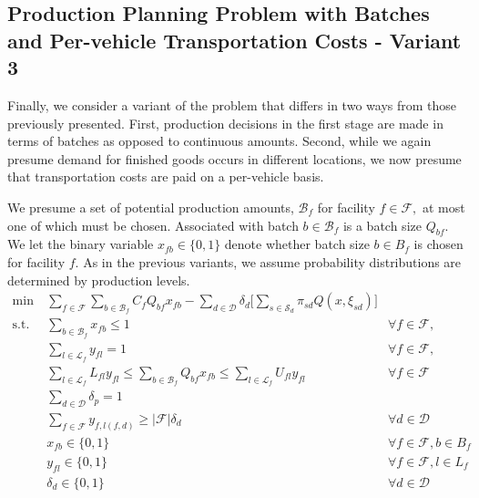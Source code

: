 \documentclass[12pt]{article}
\theoremstyle{thmstylethree}%
\newcommand{\mtc}[1] {\mathcal{#1}}
\begin{document}
\subsection{Production Planning Problem with Batches and Per-vehicle Transportation Costs - Variant 3}
\label{subsec:pp_pv_trans_costs}
Finally, we consider a variant of the problem that differs in two ways from those previously presented. First, production decisions in the first stage are made in terms of batches as opposed to continuous amounts. Second, while we again presume demand for finished goods occurs in different locations, we now presume that transportation costs are paid on a per-vehicle basis. 

We presume a set of potential production amounts, $\mtc{B}_{f}$ for facility $f \in \mtc{F},$ at most one of which must be chosen. Associated with batch $b \in \mtc{B}_{f}$ is a batch size $Q_{bf}$. We let the binary variable $x_{fb} \in \{0,1\}$ denote whether batch size $b \in B_{f}$ is chosen for facility $f.$ As in the previous variants, we assume probability distributions are determined by production levels.  %
\begin{subequations}\label{eq:ppp3}
\begin{align}
\label{eq:ppp3:obj} \min~&\sum_{f\in\mathcal{F}}\sum_{b \in \mtc{B}_{f}}C_{f}Q_{bf}x_{fb}- \sum_{d\in\mathcal{D}}\delta_{d}\Bigg[\sum_{s\in\mathcal{S}_{d}}\pi_{sd}Q(x,\xi_{sd})\Bigg]  \\
\label{eq:ppp3:c0}\text{s.t.} & \sum_{b \in \mtc{B}_{f}}x_{fb} \leq 1 & \forall f \in \mathcal{F}, \\
\label{eq:ppp3:c1} &   \sum_{l\in\mathcal{L}_{f}}y_{fl} =1 & \forall f\in\mathcal{F},  \\
\label{eq:ppp3:c2} &   \sum_{l\in\mathcal{L}_{f}}L_{fl}y_{fl} \leq \sum_{b \in \mtc{B}_{f}}Q_{bf}x_{fb}\leq \sum_{l\in\mathcal{L}_{f}}U_{fl}y_{fl} & \forall f\in\mathcal{F} \\ 
\label{eq:ppp3:c3}    & \sum_{d\in\mathcal{D}}\delta_{p} = 1 &  \\
\label{eq:ppp3:c4} &\sum_{f\in\mathcal{F}}y_{f,l(f,d)}\geq |\mathcal{F}|\delta_{d} &\forall d\in \mathcal{D} \\
\label{eq:ppp3:r1} & x_{fb} \in \{0,1\}  &\forall f\in\mathcal{F}, b \in B_{f}\\ 
\label{eq:ppp3:r2} & y_{fl} \in \{0,1\} &\forall f\in\mathcal{F}, l \in L_{f} \\
\label{eq:ppp3:r3} & \delta_{d} \in \{0,1\} &\forall d \in \mathcal{D} 
\end{align}
\end{subequations}
\end{document}
